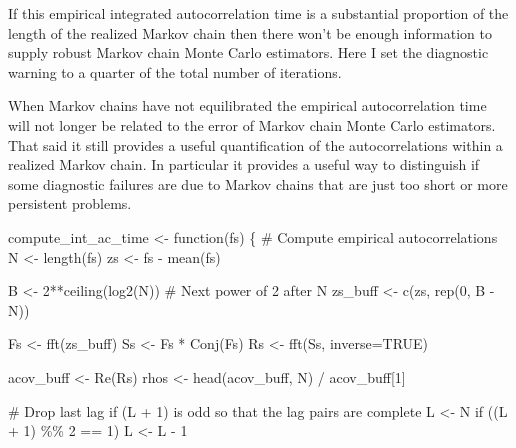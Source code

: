\documentclass[
  letterpaper,
  DIV=11,
  numbers=noendperiod]{scrartcl}
\newenvironment{Shaded}{\begin{snugshade}}{\end{snugshade}}
\newcommand{\AttributeTok}[1]{\textcolor[rgb]{0.40,0.45,0.13}{#1}}
\newcommand{\CommentTok}[1]{\textcolor[rgb]{0.37,0.37,0.37}{#1}}
\newcommand{\ConstantTok}[1]{\textcolor[rgb]{0.56,0.35,0.01}{#1}}
\newcommand{\ControlFlowTok}[1]{\textcolor[rgb]{0.00,0.23,0.31}{#1}}
\newcommand{\DecValTok}[1]{\textcolor[rgb]{0.68,0.00,0.00}{#1}}
\newcommand{\FunctionTok}[1]{\textcolor[rgb]{0.28,0.35,0.67}{#1}}
\newcommand{\NormalTok}[1]{\textcolor[rgb]{0.00,0.23,0.31}{#1}}
\newcommand{\OtherTok}[1]{\textcolor[rgb]{0.00,0.23,0.31}{#1}}
\newcommand{\SpecialCharTok}[1]{\textcolor[rgb]{0.37,0.37,0.37}{#1}}
\begin{document}
If this empirical integrated autocorrelation time is a substantial
proportion of the length of the realized Markov chain then there won't
be enough information to supply robust Markov chain Monte Carlo
estimators. Here I set the diagnostic warning to a quarter of the total
number of iterations.

When Markov chains have not equilibrated the empirical autocorrelation
time will not longer be related to the error of Markov chain Monte Carlo
estimators. That said it still provides a useful quantification of the
autocorrelations within a realized Markov chain. In particular it
provides a useful way to distinguish if some diagnostic failures are due
to Markov chains that are just too short or more persistent problems.

\begin{Shaded}
\begin{Highlighting}[]
\NormalTok{compute\_int\_ac\_time }\OtherTok{\textless{}{-}} \ControlFlowTok{function}\NormalTok{(fs) \{}
  \CommentTok{\# Compute empirical autocorrelations}
\NormalTok{  N }\OtherTok{\textless{}{-}} \FunctionTok{length}\NormalTok{(fs)}
\NormalTok{  zs }\OtherTok{\textless{}{-}}\NormalTok{ fs }\SpecialCharTok{{-}} \FunctionTok{mean}\NormalTok{(fs)}

\NormalTok{  B }\OtherTok{\textless{}{-}} \DecValTok{2}\SpecialCharTok{**}\FunctionTok{ceiling}\NormalTok{(}\FunctionTok{log2}\NormalTok{(N)) }\CommentTok{\# Next power of 2 after N}
\NormalTok{  zs\_buff }\OtherTok{\textless{}{-}} \FunctionTok{c}\NormalTok{(zs, }\FunctionTok{rep}\NormalTok{(}\DecValTok{0}\NormalTok{, B }\SpecialCharTok{{-}}\NormalTok{ N))}

\NormalTok{  Fs }\OtherTok{\textless{}{-}} \FunctionTok{fft}\NormalTok{(zs\_buff)}
\NormalTok{  Ss }\OtherTok{\textless{}{-}}\NormalTok{ Fs }\SpecialCharTok{*} \FunctionTok{Conj}\NormalTok{(Fs)}
\NormalTok{  Rs }\OtherTok{\textless{}{-}} \FunctionTok{fft}\NormalTok{(Ss, }\AttributeTok{inverse=}\ConstantTok{TRUE}\NormalTok{)}

\NormalTok{  acov\_buff }\OtherTok{\textless{}{-}} \FunctionTok{Re}\NormalTok{(Rs)}
\NormalTok{  rhos }\OtherTok{\textless{}{-}} \FunctionTok{head}\NormalTok{(acov\_buff, N) }\SpecialCharTok{/}\NormalTok{ acov\_buff[}\DecValTok{1}\NormalTok{]}

  \CommentTok{\# Drop last lag if (L + 1) is odd so that the lag pairs are complete}
\NormalTok{  L }\OtherTok{\textless{}{-}}\NormalTok{ N}
  \ControlFlowTok{if}\NormalTok{ ((L }\SpecialCharTok{+} \DecValTok{1}\NormalTok{) }\SpecialCharTok{\%\%} \DecValTok{2} \SpecialCharTok{==} \DecValTok{1}\NormalTok{)}
\NormalTok{    L }\OtherTok{\textless{}{-}}\NormalTok{ L }\SpecialCharTok{{-}} \DecValTok{1}


\end{Highlighting}
\end{Shaded}
\end{document}
